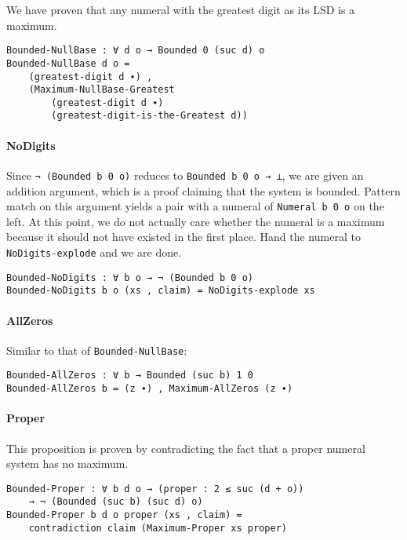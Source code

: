 \documentclass[\main/thesis.tex]{subfiles}
\begin{document}
We have proven that any numeral with the greatest digit as its LSD is a maximum.

\begin{lstlisting}
Bounded-NullBase : ∀ d o → Bounded 0 (suc d) o
Bounded-NullBase d o =
    (greatest-digit d ∙) ,
    (Maximum-NullBase-Greatest
        (greatest-digit d ∙)
        (greatest-digit-is-the-Greatest d))
\end{lstlisting}

\paragraph{NoDigits}

Since {\lstinline|¬ (Bounded b 0 o)|} reduces to {\lstinline|Bounded b 0 o → ⊥|},
we are given an addition argument, which is a proof claiming that the system is
bounded.
Pattern match on this argument yields a pair with a numeral of
{\lstinline|Numeral b 0 o|} on the left.
At this point, we do not actually care whether the numeral is a maximum
because it should not have existed in the first place.
Hand the numeral to {\lstinline|NoDigits-explode|} and we are done.

\begin{lstlisting}
Bounded-NoDigits : ∀ b o → ¬ (Bounded b 0 o)
Bounded-NoDigits b o (xs , claim) = NoDigits-explode xs
\end{lstlisting}

\paragraph{AllZeros}

Similar to that of {\lstinline|Bounded-NullBase|}:

\begin{lstlisting}
Bounded-AllZeros : ∀ b → Bounded (suc b) 1 0
Bounded-AllZeros b = (z ∙) , Maximum-AllZeros (z ∙)
\end{lstlisting}

\paragraph{Proper}

This proposition is proven by contradicting the fact that
a proper numeral system has no maximum.

\begin{lstlisting}
Bounded-Proper : ∀ b d o → (proper : 2 ≤ suc (d + o))
    → ¬ (Bounded (suc b) (suc d) o)
Bounded-Proper b d o proper (xs , claim) =
    contradiction claim (Maximum-Proper xs proper)
\end{lstlisting}
\end{document}
